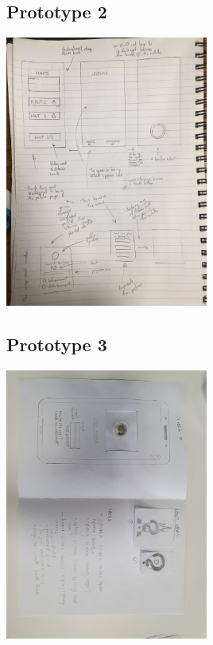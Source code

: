 \documentclass[10pt,twocolumn]{article} %
\begin{document}
\subsection*{Prototype 2}
\includegraphics[width=0.5\textwidth]{./figures/dans_initial_proto/1.jpg}

\subsection*{Prototype 3}
\includegraphics[width=0.5\textwidth]{./figures/zsuzsis_initial_proto/1.jpg}
\end{document}

